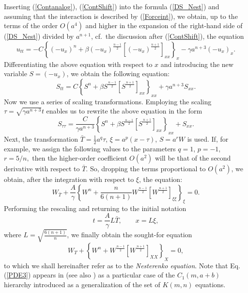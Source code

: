 \documentclass[12pt]{article}
\begin{document}
Inserting  (\ref{Contanalog}), (\ref{ContShift}) into the formula  (\ref{DS_Nest}) and assuming that  the interaction is described by (\ref{Forceint}),  we obtain, up to the terms of the order $O(a^{4})$ and higher in the expansion of the right-hand side of (\ref{DS_Nest}) divided by $a^{n+1}$, cf.\ the discussion after (\ref{ContShift}), the equation
\[
u_{tt}=-C \left\{\left(-u_x  \right)^n+\beta \left(-u_x  \right)^\frac{n-1}{2} \left[\left(-u_x  \right)^\frac{n+1}{2}  \right]_{xx}   \right\}_x-\gamma a^{n+3} \left(-u_x  \right)_{x}.
\]
Differentiating the above equation with respect to $x$ and introducing the new variable $S=\left(-u_x  \right)$,  we  obtain the following equation:
\begin{equation}\label{EqNest2}
S_{tt}=C \left\{S^n+\beta S^\frac{n-1}{2} \left[S^\frac{n+1}{2}  \right]_{xx}   \right\}_{xx}+\gamma a^{n+3} S_{xx}.
\end{equation}
Now we use a series of scaling transformations. Employing the scaling
$
\tau =\sqrt{\gamma a^{n+3}} t
$
enables us to rewrite the above equation in the form
\[
S_{\tau \tau}=\frac{C}{\gamma a^{n+3}} \left\{S^n+\beta S^\frac{n-1}{2} \left[S^\frac{n+1}{2}  \right]_{xx}   \right\}_{xx}+S_{xx}.
\]
Next, the transformation
$
\bar T=\frac{1}{2} a^q \tau$, $\xi=a^p (x-\tau)$,  $S=a^r W
$
is used. If, for example, we assign  the following values to the parameters
$
q=1$, $ p=-1$, $r=5/n,
$
then the higher-order coefficient $O(a^2)$ will be that of the second derivative with respect to $\bar T$. So, dropping the terms proportional to $O(a^2)$, we obtain, after the integration with respect to $\xi$, the equation:
\[
W_{\bar T}+\frac{A}{\gamma}\left\{W^n+\frac{n}{6 (n+1)} W^\frac{n-1}{2} \left[W^\frac{n+1}{2}  \right]_{\xi \xi}  \right\}_{\xi}=0.
\]
Performing the rescaling and returning to the initial notation
$$
 t=\frac{A}{\gamma} L   \bar T, \qquad x=L \xi,
$$
where $L=\sqrt{\frac{6 (n+1)}{n}}$, we finally obtain the sought-for equation
\begin{equation}\label{PDE3}
W_{T}+\left\{W^n+ W^\frac{n-1}{2} \left[W^\frac{n+1}{2}  \right]_{XX}  \right\}_{X}=0,
\end{equation}
to which we shall hereinafter refer as to the {\em Nesterenko equation}.
Note that Eq.(\ref{PDE3}) appears in \cite{Rosenau_06} (see also \cite{Rosenau17}) as a particular case of the $C_1(m, a+b)$ hierarchy introduced as a generalization of the set of $K(m, n)$ equations.
\end{document}
